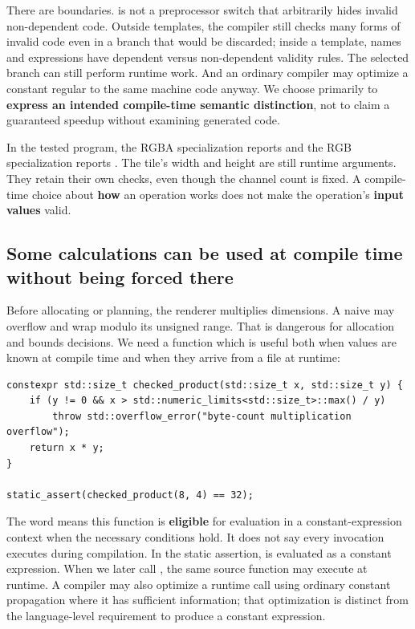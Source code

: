 There are boundaries.  is not a preprocessor switch that arbitrarily hides invalid non-dependent code. Outside templates, the compiler still checks many forms of invalid code even in a branch that would be discarded; inside a template, names and expressions have dependent versus non-dependent validity rules. The selected branch can still perform runtime work. And an ordinary compiler may optimize a constant regular  to the same machine code anyway. We choose  primarily to \textbf{express an intended compile-time semantic distinction}, not to claim a guaranteed speedup without examining generated code.

In the tested program, the RGBA specialization reports  and the RGB specialization reports . The tile's width and height are still runtime arguments. They retain their own checks, even though the channel count is fixed. A compile-time choice about \textbf{how} an operation works does not make the operation's \textbf{input values} valid.

\subsection{Some calculations can be used at compile time without being forced there}\label{05-engine-i-ch005-some-calculations-can-be-used-at-compile-time-without-being-forced-there}

\hypertarget{05-engine-i-ch005-some-calculations-can-be-used-at-compile-time-without-being-forced-there}{}

Before allocating or planning, the renderer multiplies dimensions. A naive  may overflow  and wrap modulo its unsigned range. That is dangerous for allocation and bounds decisions. We need a function which is useful both when values are known at compile time and when they arrive from a file at runtime:

\begin{verbatim}
constexpr std::size_t checked_product(std::size_t x, std::size_t y) {
    if (y != 0 && x > std::numeric_limits<std::size_t>::max() / y)
        throw std::overflow_error("byte-count multiplication overflow");
    return x * y;
}

static_assert(checked_product(8, 4) == 32);
\end{verbatim}

The word  means this function is \textbf{eligible} for evaluation in a constant-expression context when the necessary conditions hold. It does not say every invocation executes during compilation. In the static assertion,  is evaluated as a constant expression. When we later call , the same source function may execute at runtime. A compiler may also optimize a runtime call using ordinary constant propagation where it has sufficient information; that optimization is distinct from the language-level requirement to produce a constant expression.

